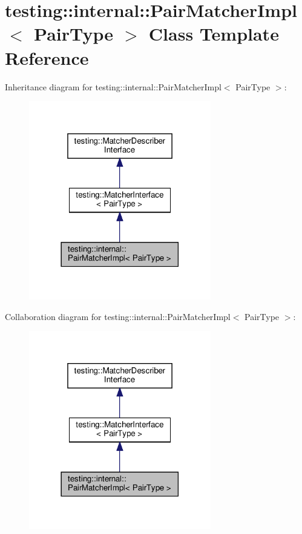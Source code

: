\hypertarget{classtesting_1_1internal_1_1_pair_matcher_impl}{}\section{testing\+:\+:internal\+:\+:Pair\+Matcher\+Impl$<$ Pair\+Type $>$ Class Template Reference}
\label{classtesting_1_1internal_1_1_pair_matcher_impl}


Inheritance diagram for testing\+:\+:internal\+:\+:Pair\+Matcher\+Impl$<$ Pair\+Type $>$\+:
\nopagebreak
\begin{figure}[H]
\begin{center}
\leavevmode
\includegraphics[width=225pt]{classtesting_1_1internal_1_1_pair_matcher_impl__inherit__graph}
\end{center}
\end{figure}


Collaboration diagram for testing\+:\+:internal\+:\+:Pair\+Matcher\+Impl$<$ Pair\+Type $>$\+:
\nopagebreak
\begin{figure}[H]
\begin{center}
\leavevmode
\includegraphics[width=225pt]{classtesting_1_1internal_1_1_pair_matcher_impl__coll__graph}
\end{center}
\end{figure}

